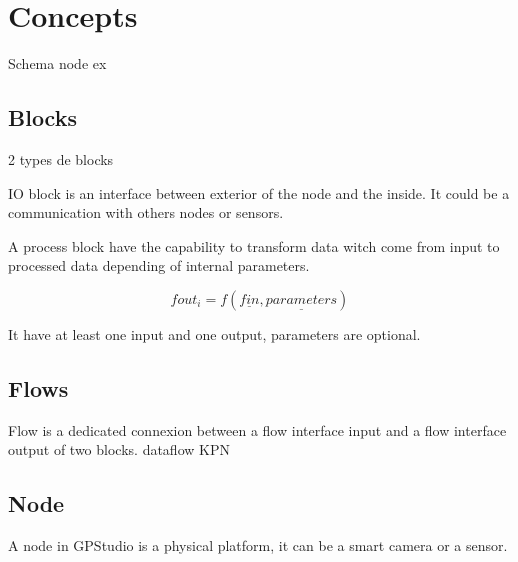 \chapter{Concepts}

Schema node ex

\section{Blocks}

2 types de blocks

IO block is an interface between exterior of the node and the inside. It could be a communication with others nodes or sensors. 

A process block have the capability to transform data witch come from input to processed data depending of internal parameters.

\begin{equation}
fout_{i}=f(\underline{fin}, \underline{parameters})
\end{equation}

It have at least one input and one output, parameters are optional.

\section{Flows}
Flow is a dedicated connexion between a flow interface input and a flow interface output of two blocks. dataflow KPN

\section{Node}
A node in GPStudio is a physical platform, it can be a smart camera or a sensor.
